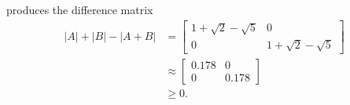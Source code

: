 \begin{example}
\[    \]
    produces the difference matrix
\begin{align*}
    |A|+|B|-|A+B| &= 
    \begin{bmatrix} 1 +  \sqrt{2} - \sqrt{5} & 0 \\ 0 &  1 +  \sqrt{2} - \sqrt{5} \end{bmatrix} \\
    &\approx
    \begin{bmatrix}
        0.178 & 0 \\ 0 & 0.178
    \end{bmatrix}\\
    &\geq
    0.
\end{align*}
\end{example}
